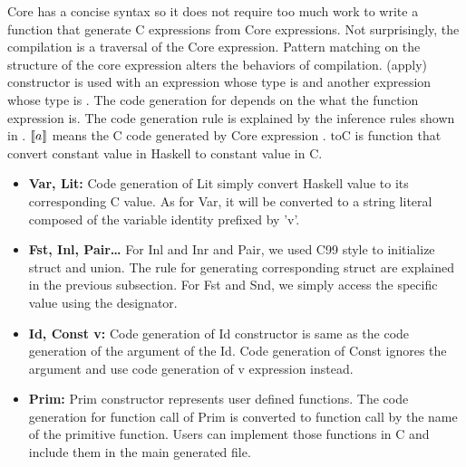 Core has a concise syntax so it does not require too much work to write a function that generate C expressions from Core expressions. Not surprisingly, the compilation is a traversal of the Core expression. Pattern matching on the structure of the core expression alters the behaviors of compilation.  (apply) constructor is used with an expression whose type is  and another expression whose type is . The code generation for  depends on the what the function expression is. The code generation rule is explained by the inference rules shown in . $\llbracket a \rrbracket$ means the C code generated by Core expression . $\text{toC}$ is function that convert constant value in Haskell to constant value in C. 
\begin{itemize}
    \item \textbf{Var, Lit:} Code generation of Lit simply convert Haskell value to its corresponding C value. As for Var, it will be converted to a string literal composed of the variable identity prefixed by 'v'.
    \item \textbf{Fst, Inl, Pair\dots} For Inl and Inr and Pair, we used C99 style to initialize struct and union. The rule for generating corresponding struct are explained in the previous subsection. For Fst and Snd, we simply access the specific value using the designator.
    \item \textbf{Id, Const v:} Code generation of Id constructor is same as the code generation of the argument of the Id. Code generation of Const ignores the argument and use code generation of v expression instead.
    \item \textbf{Prim:} Prim constructor represents user defined functions. The code generation for function call of Prim is converted to function call by the name of the primitive function. Users can implement those functions in C and include them in the main generated file.
\end{itemize}

